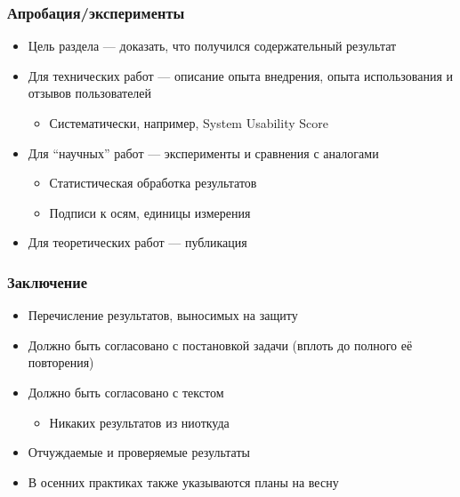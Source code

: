 \documentclass[xetex,mathserif,serif]{beamer}
\begin{document}
    \begin{frame}
        \frametitle{Апробация/эксперименты}
        \begin{itemize}
            \item Цель раздела --- доказать, что получился содержательный результат
            \item Для технических работ --- описание опыта внедрения, опыта использования и отзывов пользователей
            \begin{itemize}
                \item Систематически, например, System Usability Score
            \end{itemize}
            \item Для ``научных'' работ --- эксперименты и сравнения с аналогами
            \begin{itemize}
                \item Статистическая обработка результатов
                \item Подписи к осям, единицы измерения
            \end{itemize}
            \item Для теоретических работ --- публикация
        \end{itemize}
    \end{frame}

    \begin{frame}
        \frametitle{Заключение}
        \begin{itemize}
            \item Перечисление результатов, выносимых на защиту
            \item Должно быть согласовано с постановкой задачи (вплоть до полного её повторения)
            \item Должно быть согласовано с текстом
            \begin{itemize}
                \item Никаких результатов из ниоткуда
            \end{itemize}
            \item Отчуждаемые и проверяемые результаты
            \item В осенних практиках также указываются планы на весну
        \end{itemize}
    \end{frame}
\end{document}
